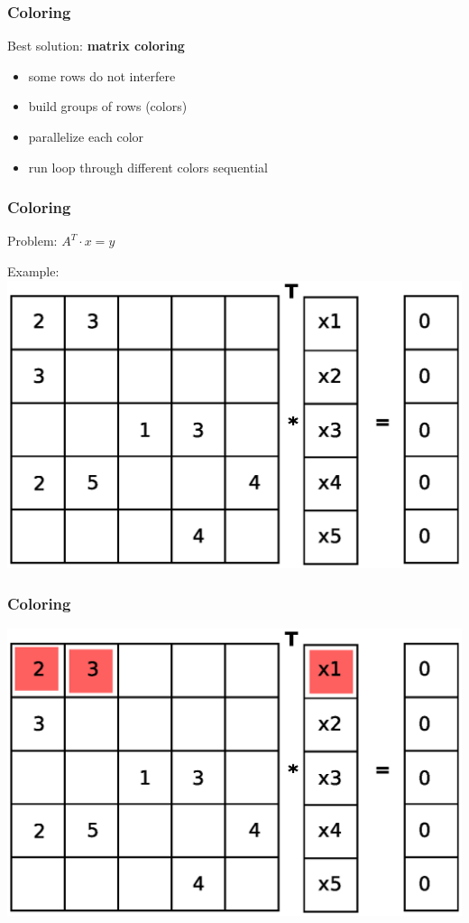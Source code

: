 \documentclass{beamer}
\begin{document}
\begin{frame}
\frametitle{Coloring}
Best solution: \textbf{matrix coloring}
\begin{itemize}
\item some rows do not interfere
\item build groups of rows (colors)
\item parallelize each color
\item run loop through different colors sequential
\end{itemize}
\end{frame}

\begin{frame}
\frametitle{Coloring}
Problem: $A^T \cdot x= y$

Example:
\includegraphics[width=0.9\linewidth]{graphic/coloringT2.eps}
\end{frame}

\begin{frame}
\frametitle{Coloring}
\includegraphics[width=0.8\linewidth]{graphic/coloringT3.eps}
\end{frame}
\end{document}
